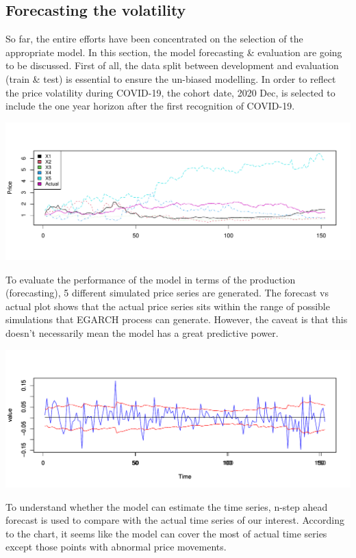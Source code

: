 \documentclass[
  11pt,
]{article}
\begin{document}
\hypertarget{forecasting-the-volatility}{%
\subsection{Forecasting the
volatility}\label{forecasting-the-volatility}}

So far, the entire efforts have been concentrated on the selection of
the appropriate model. In this section, the model forecasting \&
evaluation are going to be discussed. First of all, the data split
between development and evaluation (train \& test) is essential to
ensure the un-biased modelling. In order to reflect the price volatility
during COVID-19, the cohort date, 2020 Dec, is selected to include the
one year horizon after the first recognition of COVID-19.

\includegraphics{ST436_Project_files/figure-latex/unnamed-chunk-28-1.pdf}

To evaluate the performance of the model in terms of the production
(forecasting), 5 different simulated price series are generated. The
forecast vs actual plot shows that the actual price series sits within
the range of possible simulations that EGARCH process can generate.
However, the caveat is that this doesn't necessarily mean the model has
a great predictive power.

\includegraphics{ST436_Project_files/figure-latex/unnamed-chunk-29-1.pdf}

To understand whether the model can estimate the time series, n-step
ahead forecast is used to compare with the actual time series of our
interest. According to the chart, it seems like the model can cover the
most of actual time series except those points with abnormal price
movements.
\end{document}
